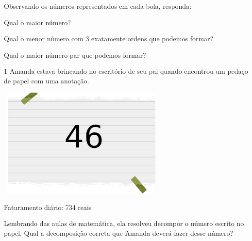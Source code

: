 

Observando os números representados em cada bola, responda:

\begin{escolha}
\item Qual o maior número?


\item Qual o menor número com 3 exatamente ordens que podemos formar?


\item Qual o maior número par que podemos formar?


\end{escolha}



\num{1} Amanda estava brincando no escritório de seu pai quando
encontrou um pedaço de papel com uma anotação.

\includegraphics[width=3.30833in,height=2.17391in]{media/image2.png}



Faturamento diário: 734 reais

Lembrando das aulas de matemática, ela resolveu decompor o número escrito
no papel. Qual a decomposição correta que Amanda deverá fazer desse
número?

